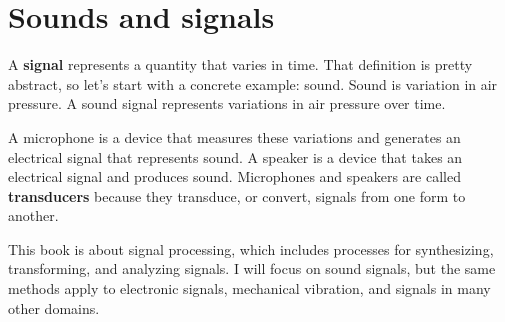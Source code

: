 \documentclass[12pt]{book} \usepackage[width=5.5in,height=8.5in, hmarginratio=3:2,vmarginratio=1:1]{geometry}
\begin{document}
\normalsize

\clearemptydoublepage

\begin{latexonly} 

\tableofcontents

\clearemptydoublepage

\end{latexonly} 

\mainmatter

\chapter{Sounds and signals} \label{sounds} 

A {\bf signal} represents a quantity that varies in time. That definition is pretty abstract, so let's start with a concrete example: sound. Sound is variation in air pressure. A sound signal represents variations in air pressure over time. 

A microphone is a device that measures these variations and generates an electrical signal that represents sound. A speaker is a device that takes an electrical signal and produces sound. Microphones and speakers are called {\bf transducers} because they transduce, or convert, signals from one form to another. 

This book is about signal processing, which includes processes for synthesizing, transforming, and analyzing signals. I will focus on sound signals, but the same methods apply to electronic signals, mechanical vibration, and signals in many other domains. 
\end{document}
